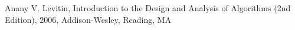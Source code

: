\documentclass{article}
\begin{document}
\newpage
\clearpage
\begin{thebibliography}{9}

   Anany V. Levitin,
  Introduction to the Design and Analysis of Algorithms (2nd Edition),
  2006,
  Addison-Wesley,
 Reading, MA

\end{thebibliography} 
\end{document}
